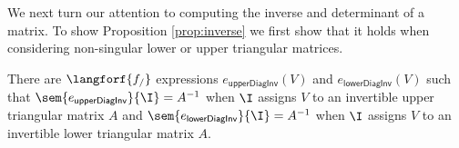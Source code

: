 \newtheorem*{INVERSE}{Proposition~\ref{prop:inverse}}
We next turn our attention to computing the inverse and determinant of a matrix.
To show Proposition \ref{prop:inverse} we first show that it holds when considering non-singular lower or upper triangular matrices.
\begin{lemma}\label{prop:upperlowerinverse}
There are $\langforf{f_/}$ expressions $e_{\mathsf{upperDiagInv}}(V)$ and $e_{\mathsf{lowerDiagInv}}(V)$
such that $\sem{e_{\mathsf{upperDiagInv}}}{\I}=A^{-1}$ when $\I$ assigns $V$
to an invertible upper triangular matrix $A$ and $\sem{e_{\mathsf{lowerDiagInv}}}{\I}=A^{-1}$ when $\I$ assigns $V$
to an invertible lower triangular matrix $A$.
\end{lemma}

